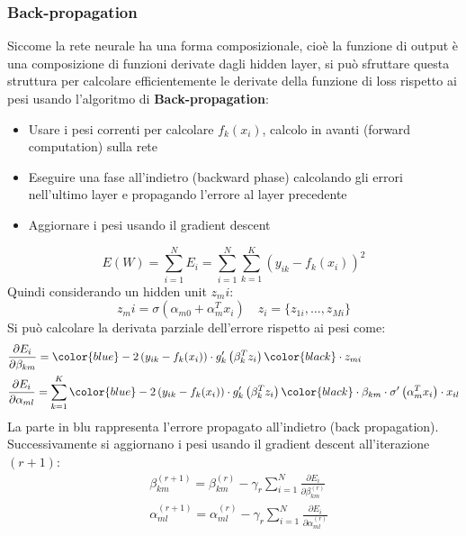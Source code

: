 \documentclass[a4paper]{article}
\begin{document}
\subsubsection{Back-propagation}
Siccome la rete neurale ha una forma composizionale, cioè la funzione di output
è una composizione di funzioni derivate dagli hidden layer, si può sfruttare questa
struttura per calcolare efficientemente le derivate
della funzione di loss rispetto ai pesi usando l'algoritmo di \textbf{Back-propagation}:
\begin{itemize}
  \item Usare i pesi correnti per calcolare \( f_k(x_i) \), calcolo in avanti
    (forward computation) sulla rete

  \item Eseguire una fase all'indietro (backward phase) calcolando gli errori
    nell'ultimo layer e propagando l'errore al layer precedente

  \item Aggiornare i pesi usando il gradient descent
\end{itemize}
\[
  E(W) = \sum_{i=1}^{N} E_i = \sum_{i=1}^{N} \sum_{k=1}^{K} \left( y_{ik} - f_k(x_i) \right)^2
\] 
Quindi considerando un hidden unit \( z_mi \):
\[
  z_mi = \sigma \left( \alpha_{m0} + \alpha_{m}^T x_i \right) \quad z_i = \{ z_{1i}, \ldots, z_{Mi} \}
\] 
Si può calcolare la derivata parziale dell'errore rispetto ai pesi come:
\[
  \begin{aligned}
    &\frac{\partial E_i}{\partial \beta_{km}} = \color{blue}-2 \left( y_{ik} - f_k(x_i) \right) \cdot
    g'_k \left( \beta_{k}^T z_i \right)\color{black} \cdot z_{mi}\\
    &\frac{\partial E_i}{\partial \alpha_{ml}} = \sum_{k=1}^{K} \color{blue}-2
    \left( y_{ik} - f_k(x_i) \right) \cdot g'_k \left( \beta_{k}^T z_i \right)\color{black} \cdot
    \beta_{km} \cdot \sigma' \left( \alpha_{m}^T x_i \right) \cdot x_{il}
  \end{aligned}
\] 
La parte in blu rappresenta l'errore propagato all'indietro (back propagation).
Successivamente si aggiornano i pesi usando il gradient descent all'iterazione \( (r+1) \):
\[
  \begin{aligned}
    &\beta_{km}^{(r+1)} = \beta_{km}^{(r)} - \gamma_r \sum_{i=1}^{N} \frac{\partial E_i}{\partial \beta_{km}^{(r)}}\\
    &\alpha_{ml}^{(r+1)} = \alpha_{ml}^{(r)} - \gamma_r \sum_{i=1}^{N} \frac{\partial E_i}{\partial \alpha_{ml}^{(r)}}
  \end{aligned}
\] 
\end{document}
